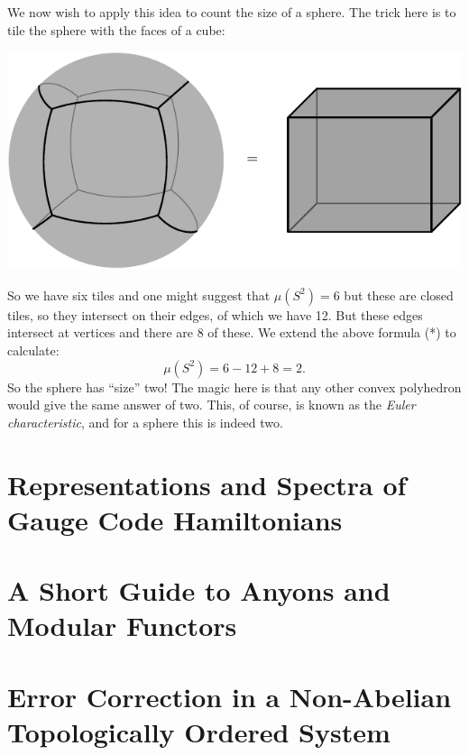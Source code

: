 \documentclass[11pt,twoside,openright]{report}
\newcommand{\todo}[1]{\textcolor{red}{#1}}
\begin{document}
We now wish to apply this idea to count the
size of a sphere. The trick here is to tile the
sphere with the faces of a cube:
\begin{center}
\includegraphics{pic-cube.pdf}
\end{center}
So we have six tiles and one might suggest that 
$\mu(S^2)=6$ but these are closed tiles, so they
intersect on their edges, of which we have 12.
But these edges intersect at vertices and there are
8 of these. 
We extend the above formula (*) to calculate:
$$
    \mu(S^2) = 6 - 12 + 8 = 2.
$$
So the sphere has ``size'' two!
The magic here is that any other convex polyhedron would give
the same answer of two.
This, of course, is known as the \emph{Euler characteristic},
and for a sphere this is indeed two.



%
%

%


\chapter{Representations and Spectra of Gauge Code Hamiltonians}




\chapter{A Short Guide to Anyons and Modular Functors}




\chapter{Error Correction in a Non-Abelian Topologically Ordered System}





{}

\end{document}
